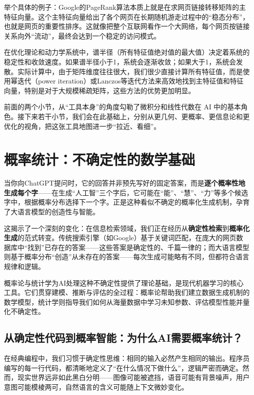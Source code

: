 举个具体的例子：Google的PageRank算法本质上就是在求网页链接转移矩阵的主特征向量。这个主特征向量给出了各个网页在长期随机游走过程中的“稳态分布”，也就是网页的重要性排序。这就像把整个互联网看作一个大网络，每个网页按链接关系向外“流动”，最终会达到一个稳定的访问模式。

在优化理论和动力学系统中，谱半径（所有特征值绝对值的最大值）决定着系统的稳定性和收敛速度。如果谱半径小于1，系统会逐渐收敛；如果大于1，系统会发散。实际计算中，由于矩阵维度往往很大，我们很少直接计算所有特征值，而是使用幂迭代（power iteration）或Lanczos等迭代方法来高效地找到主特征值和特征向量，特别是对于大规模稀疏矩阵，这些方法的优势更加明显。

前面的两个小节，从“工具本身”的角度勾勒了微积分和线性代数在 AI 中的基本角色。接下来若干小节，我们会在此基础上，分别从更几何、更概率、更信息论和更优化的视角，把这张工具地图进一步“拉近、看细”。

\section{概率统计：不确定性的数学基础}


当你向ChatGPT提问时，它的回答并非预先写好的固定答案，而是\textbf{逐个概率性地生成每个字}——在生成``人工智''三个字后，它可能在``能''、``慧''、``力''等多个候选字中，根据概率分布选择下一个字。正是这种看似不确定的概率化生成机制，孕育了大语言模型的创造性与智能。

这揭示了一个深刻的变化：在信息检索领域，我们正在经历从\textbf{确定性检索}到\textbf{概率化生成}的范式转变。传统搜索引擎（如Google）基于关键词匹配，在庞大的网页数据库中``找到''已存在的答案——这些答案是确定性的、千篇一律的；而大语言模型则基于概率分布``创造''从未存在的答案——每次生成可能略有不同，但都符合语言规律和逻辑。

概率论与统计学为AI处理这种不确定性提供了理论基础，是现代机器学习的核心工具。它们贯穿建模、推断与评估的全过程：概率论帮助我们建立数据生成机制的数学模型，统计学则指导我们如何从海量数据中学习未知参数、评估模型性能并量化不确定性。

\subsection{从确定性代码到概率智能：为什么AI需要概率统计？}

在经典编程中，我们习惯于确定性思维：相同的输入必然产生相同的输出。程序员编写的每一行代码，都清晰地定义了``在什么情况下做什么''，逻辑严密而确定。然而，现实世界远非如此黑白分明——图像可能被遮挡，语音可能有背景噪声，用户意图可能模棱两可，自然语言的含义可能随上下文微妙变化。


